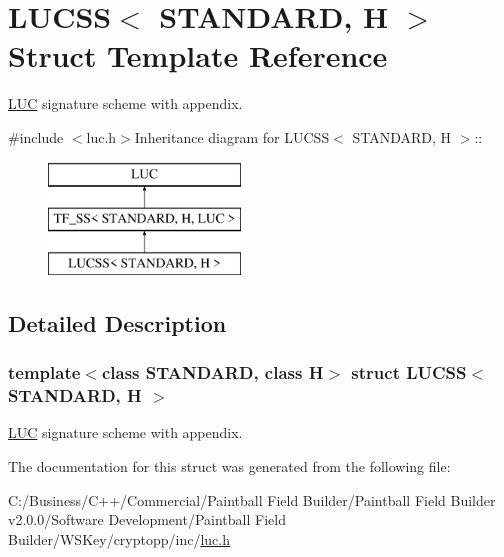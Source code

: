 \hypertarget{struct_l_u_c_s_s}{
\section{LUCSS$<$ STANDARD, H $>$ Struct Template Reference}
\label{struct_l_u_c_s_s}
}


\hyperlink{struct_l_u_c}{LUC} signature scheme with appendix.  


{\ttfamily \#include $<$luc.h$>$}Inheritance diagram for LUCSS$<$ STANDARD, H $>$::\begin{figure}[H]
\begin{center}
\leavevmode
\includegraphics[height=3cm]{struct_l_u_c_s_s}
\end{center}
\end{figure}


\subsection{Detailed Description}
\subsubsection*{template$<$class STANDARD, class H$>$ struct LUCSS$<$ STANDARD, H $>$}

\hyperlink{struct_l_u_c}{LUC} signature scheme with appendix. 

The documentation for this struct was generated from the following file:\begin{DoxyCompactItemize}
\item 
C:/Business/C++/Commercial/Paintball Field Builder/Paintball Field Builder v2.0.0/Software Development/Paintball Field Builder/WSKey/cryptopp/inc/\hyperlink{luc_8h}{luc.h}\end{DoxyCompactItemize}
